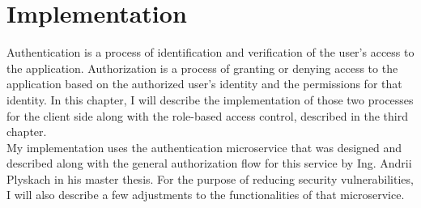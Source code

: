 \chapter{Implementation}
Authentication is a process of identification and verification of the user's access to the application. Authorization is a process of granting or denying access to the application based on the authorized user's identity and the permissions for that identity. In this chapter, I will describe the implementation of those two processes for the client side along with the role-based access control, described in the third chapter.\\
My implementation uses the authentication microservice that was designed and described along with the general authorization flow for this service by Ing. Andrii Plyskach in his master thesis\cite{mt-plyskach}. For the purpose of reducing security vulnerabilities, I will also describe a few adjustments to the functionalities of that microservice.

















